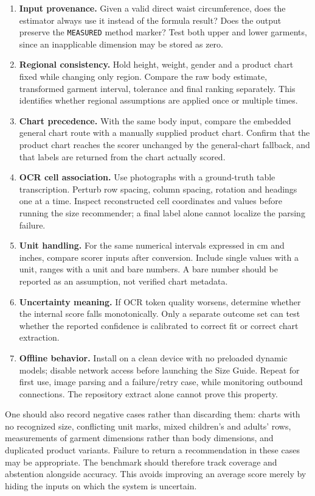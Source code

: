 \documentclass[11pt,a4paper]{article}
\begin{document}
\begin{enumerate}
\item \textbf{Input provenance.} Given a valid direct waist circumference, does the estimator always use it instead of the formula result? Does the output preserve the \texttt{MEASURED} method marker? Test both upper and lower garments, since an inapplicable dimension may be stored as zero.
\item \textbf{Regional consistency.} Hold height, weight, gender and a product chart fixed while changing only region. Compare the raw body estimate, transformed garment interval, tolerance and final ranking separately. This identifies whether regional assumptions are applied once or multiple times.
\item \textbf{Chart precedence.} With the same body input, compare the embedded general chart route with a manually supplied product chart. Confirm that the product chart reaches the scorer unchanged by the general-chart fallback, and that labels are returned from the chart actually scored.
\item \textbf{OCR cell association.} Use photographs with a ground-truth table transcription. Perturb row spacing, column spacing, rotation and headings one at a time. Inspect reconstructed cell coordinates and values before running the size recommender; a final label alone cannot localize the parsing failure.
\item \textbf{Unit handling.} For the same numerical intervals expressed in cm and inches, compare scorer inputs after conversion. Include single values with a unit, ranges with a unit and bare numbers. A bare number should be reported as an assumption, not verified chart metadata.
\item \textbf{Uncertainty meaning.} If OCR token quality worsens, determine whether the internal score falls monotonically. Only a separate outcome set can test whether the reported confidence is calibrated to correct fit or correct chart extraction.
\item \textbf{Offline behavior.} Install on a clean device with no preloaded dynamic models; disable network access before launching the Size Guide. Repeat for first use, image parsing and a failure/retry case, while monitoring outbound connections. The repository extract alone cannot prove this property.
\end{enumerate}

One should also record negative cases rather than discarding them: charts with no recognized size, conflicting unit marks, mixed children's and adults' rows, measurements of garment dimensions rather than body dimensions, and duplicated product variants. Failure to return a recommendation in these cases may be appropriate. The benchmark should therefore track coverage and abstention alongside accuracy. This avoids improving an average score merely by hiding the inputs on which the system is uncertain.
\end{document}
